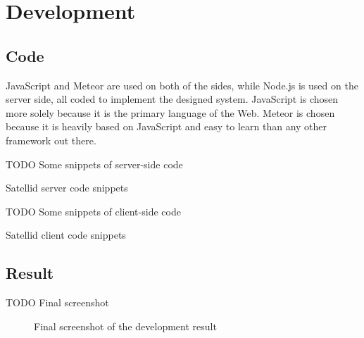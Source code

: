 \section{Development}
\label{sec:development}

\subsection{Code}

JavaScript and Meteor are used on both of the sides, while Node.js is used on the server side, all coded to implement the designed system.
JavaScript is chosen more solely because it is the primary language of the Web.
Meteor is chosen because it is heavily based on JavaScript and easy to learn than any other framework out there.

TODO Some snippets of server-side code

\begin{listing}[htbp]
  \caption{Satellid server code snippets}
  \label{lst:satellid-code-server}
\end{listing}

TODO Some snippets of client-side code

\begin{listing}[htbp]
  \caption{Satellid client code snippets}
  \label{lst:satellid-code-client}
\end{listing}

\subsection{Result}

TODO Final screenshot

\begin{figure}[htb]
  \centering
  \caption{Final screenshot of the development result}
  \label{fig:satellid-result}
\end{figure}
